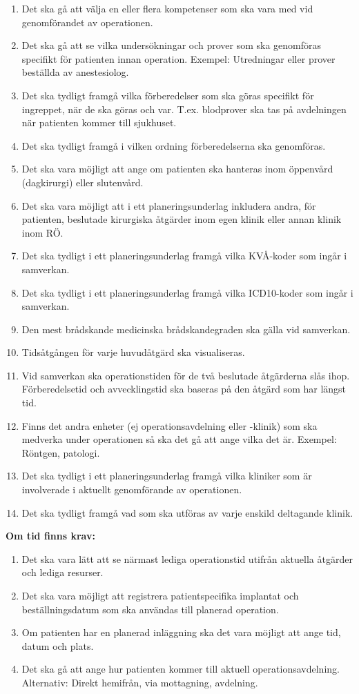 \documentclass{article}
\begin{document}
\begin{enumerate}
\item Det ska gå att välja en eller flera kompetenser som ska vara med vid
genomförandet av operationen.
\item Det ska gå att se vilka undersökningar och prover som ska genomföras
specifikt för patienten innan operation. Exempel: Utredningar eller prover
beställda av anestesiolog.
\item Det ska tydligt framgå vilka förberedelser som ska göras specifikt för
ingreppet, när de ska göras och var. T.ex. blodprover ska tas på avdelningen
när patienten kommer till sjukhuset.
\item Det ska tydligt framgå i vilken ordning förberedelserna ska genomföras.
\item Det ska vara möjligt att ange om patienten ska hanteras inom öppenvård
(dagkirurgi) eller slutenvård.
\item Det ska vara möjligt att i ett planeringsunderlag inkludera andra, för
patienten, beslutade kirurgiska åtgärder inom egen klinik eller annan klinik
inom RÖ.
\item Det ska tydligt i ett planeringsunderlag framgå vilka KVÅ-koder som ingår
i samverkan.
\item Det ska tydligt i ett planeringsunderlag framgå vilka ICD10-koder som
ingår i samverkan.
\item Den mest brådskande medicinska brådskandegraden ska gälla vid samverkan.
\item Tidsåtgången för varje huvudåtgärd ska visualiseras.
\item Vid samverkan ska operationstiden för de två beslutade åtgärderna slås
ihop. Förberedelsetid och avvecklingstid ska baseras på den åtgärd som har
längst tid.
\item Finns det andra enheter (ej operationsavdelning eller -klinik) som ska
medverka under operationen så ska det gå att ange vilka det är.
Exempel: Röntgen, patologi.
\item Det ska tydligt i ett planeringsunderlag framgå vilka kliniker som är
involverade i aktuellt genomförande av operationen.
\item Det ska tydligt framgå vad som ska utföras av varje enskild deltagande
klinik.
\end{enumerate}
\textbf{Om tid finns krav:}
\begin{enumerate}
  \item Det ska vara lätt att se närmast lediga operationstid utifrån aktuella
  åtgärder och lediga resurser.
  \item Det ska vara möjligt att registrera patientspecifika implantat och
  beställningsdatum som ska användas till planerad operation.
  \item Om patienten har en planerad inläggning ska det vara möjligt att ange
  tid, datum och plats.
  \item Det ska gå att ange hur patienten kommer till aktuell
  operationsavdelning. Alternativ: Direkt hemifrån, via mottagning, avdelning.
\end{enumerate}
\end{document}
